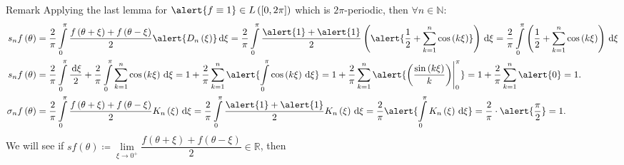 \begin{frame}
	\frametitle{\secname}

	\begin{block}{Remark}
		Applying the last lemma for
		\begin{math}
			\alert{f\equiv 1}\in
			L\left(\left[0,2\pi\right]\right)
		\end{math}
		which is $2\pi$-periodic, then
		\begin{math}
			\forall n\in\mathds{N}
		\end{math}:
		\begin{align*}
			s_{n}f\left(\theta\right)      & =
			\frac{2}{\pi}
			\int\limits_{0}^{\pi}
			\frac{f\left(\theta+\xi\right)+f\left(\theta-\xi\right)}{2}
			\alert{D_{n}\left(\xi\right)}
			\dl\xi
			=
			\frac{2}{\pi}
			\int\limits_{0}^{\pi}
			\frac{\alert{1}+\alert{1}}{2}
			\left(
			\alert{\frac{1}{2}+\sum_{k=1}^{n}\cos\left(k\xi\right)}
			\right)
			\dl\xi
			=
			\frac{2}{\pi}
			\int\limits_{0}^{\pi}
			\left(
			\frac{1}{2}+\sum_{k=1}^{n}\cos\left(k\xi\right)
			\right)
			\dl\xi                             \\
			s_{n}f\left(\theta\right)      & =
			\frac{2}{\pi}
			\int\limits_{0}^{\pi}
			\frac{\dl\xi}{2}
			+
			\frac{2}{\pi}
			\int\limits_{0}^{\pi}
			\sum_{k=1}^{n}
			\cos\left(k\xi\right)
			\dl\xi
			=
			1+
			\frac{2}{\pi}
			\sum_{k=1}^{n}
			\alert{
				\int\limits_{0}^{\pi}
				\cos\left(k\xi\right)
				{\dl\xi}
			}
			=
			1+
			\frac{2}{\pi}
			\sum_{k=1}^{n}
			\alert{
				{
						\left(
						\frac{\sin\left(k\xi\right)}{k}
						\right)
						\Biggr|
					}_{0}^{\pi}
			}
			=
			1+
			\frac{2}{\pi}
			\sum_{k=1}^{n}
			\alert{0}=
			1.                                 \\
			\sigma_{n}f\left(\theta\right) & =
			\frac{2}{\pi}
			\int\limits_{0}^{\pi}
			\frac{f\left(\theta+\xi\right)+f\left(\theta-\xi\right)}{2}
			K_{n}\left(\xi\right)
			\dl\xi=
			\frac{2}{\pi}
			\int\limits_{0}^{\pi}
			\frac{\alert{1}+\alert{1}}{2}
			K_{n}\left(\xi\right)
			\dl\xi
			=
			\frac{2}{\pi}
			\alert{
				\int\limits_{0}^{\pi}
				K_{n}\left(\xi\right)
				{\dl\xi}
			}
			=
			\frac{2}{\pi}\cdot
			\alert{\frac{\pi}{2}}
			=
			1.
		\end{align*}
		We will see if
		\begin{math}
			sf\left(\theta\right)\coloneqq
			\lim\limits_{\xi\to0^{+}}
			\dfrac{
				f\left(\theta+\xi\right)+f\left(\theta-\xi\right)
			}{2}\in\mathds{R}
		\end{math},
		then
		\begin{math}

\end{math}
\end{block}
\end{frame}
